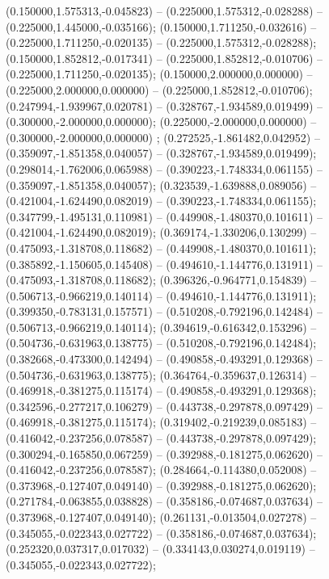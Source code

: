  (0.150000,1.575313,-0.045823) -- (0.225000,1.575312,-0.028288) -- (0.225000,1.445000,-0.035166);
 (0.150000,1.711250,-0.032616) -- (0.225000,1.711250,-0.020135) -- (0.225000,1.575312,-0.028288);
 (0.150000,1.852812,-0.017341) -- (0.225000,1.852812,-0.010706) -- (0.225000,1.711250,-0.020135);
 (0.150000,2.000000,0.000000) -- (0.225000,2.000000,0.000000) -- (0.225000,1.852812,-0.010706);
 (0.247994,-1.939967,0.020781) -- (0.328767,-1.934589,0.019499) -- (0.300000,-2.000000,0.000000);
 (0.225000,-2.000000,0.000000) -- (0.300000,-2.000000,0.000000) ;
 (0.272525,-1.861482,0.042952) -- (0.359097,-1.851358,0.040057) -- (0.328767,-1.934589,0.019499);
 (0.298014,-1.762006,0.065988) -- (0.390223,-1.748334,0.061155) -- (0.359097,-1.851358,0.040057);
 (0.323539,-1.639888,0.089056) -- (0.421004,-1.624490,0.082019) -- (0.390223,-1.748334,0.061155);
 (0.347799,-1.495131,0.110981) -- (0.449908,-1.480370,0.101611) -- (0.421004,-1.624490,0.082019);
 (0.369174,-1.330206,0.130299) -- (0.475093,-1.318708,0.118682) -- (0.449908,-1.480370,0.101611);
 (0.385892,-1.150605,0.145408) -- (0.494610,-1.144776,0.131911) -- (0.475093,-1.318708,0.118682);
 (0.396326,-0.964771,0.154839) -- (0.506713,-0.966219,0.140114) -- (0.494610,-1.144776,0.131911);
 (0.399350,-0.783131,0.157571) -- (0.510208,-0.792196,0.142484) -- (0.506713,-0.966219,0.140114);
 (0.394619,-0.616342,0.153296) -- (0.504736,-0.631963,0.138775) -- (0.510208,-0.792196,0.142484);
 (0.382668,-0.473300,0.142494) -- (0.490858,-0.493291,0.129368) -- (0.504736,-0.631963,0.138775);
 (0.364764,-0.359637,0.126314) -- (0.469918,-0.381275,0.115174) -- (0.490858,-0.493291,0.129368);
 (0.342596,-0.277217,0.106279) -- (0.443738,-0.297878,0.097429) -- (0.469918,-0.381275,0.115174);
 (0.319402,-0.219239,0.085183) -- (0.416042,-0.237256,0.078587) -- (0.443738,-0.297878,0.097429);
 (0.300294,-0.165850,0.067259) -- (0.392988,-0.181275,0.062620) -- (0.416042,-0.237256,0.078587);
 (0.284664,-0.114380,0.052008) -- (0.373968,-0.127407,0.049140) -- (0.392988,-0.181275,0.062620);
 (0.271784,-0.063855,0.038828) -- (0.358186,-0.074687,0.037634) -- (0.373968,-0.127407,0.049140);
 (0.261131,-0.013504,0.027278) -- (0.345055,-0.022343,0.027722) -- (0.358186,-0.074687,0.037634);
 (0.252320,0.037317,0.017032) -- (0.334143,0.030274,0.019119) -- (0.345055,-0.022343,0.027722);
